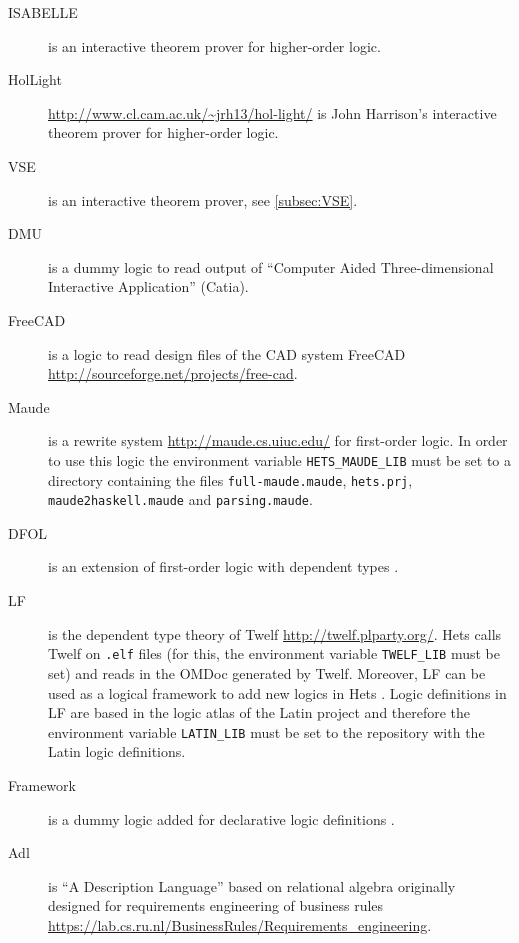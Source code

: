 \documentclass{article}
\newcommand{\normalTEXTSC}[2]{{#1\scriptsize#2}}
\newcommand     {\Isabelle}{\normalTEXTSC{I}{SABELLE}\xspace}
\begin{document}
\begin{description}
\item[\Isabelle] \cite{NipPauWen02} is an interactive theorem prover
  for higher-order logic.

\item[HolLight] \url{http://www.cl.cam.ac.uk/~jrh13/hol-light/}
  is John Harrison's interactive theorem prover
  for higher-order logic.

\item[VSE] is an interactive theorem prover, see \ref{subsec:VSE}.

\item[DMU] is a dummy logic to read output of ``Computer Aided
  Three-dimensional Interactive Application'' (Catia).

\item[FreeCAD] is a logic to read design files of the CAD system
  FreeCAD\\\url{http://sourceforge.net/projects/free-cad}.

\item[Maude] is a rewrite system \url{http://maude.cs.uiuc.edu/} for
  first-order logic. In order to use this logic the environment variable
  \verb+HETS_MAUDE_LIB+ must be set to a directory containing the files
  \verb+full-maude.maude+, \verb+hets.prj+, \verb+maude2haskell.maude+ and
  \verb+parsing.maude+.

\item[DFOL] is an extension of first-order logic with dependent types \cite{rabe:dfol:06}.

\item [LF] is the dependent type theory of Twelf \url{http://twelf.plparty.org/}. Hets
      calls Twelf on \verb+.elf+ files (for this, the environment variable
      \verb+TWELF_LIB+ must be set) and reads in the OMDoc generated by Twelf.
      Moreover, LF can be used as a logical framework to add new logics in Hets \cite{CHK+2011a}.
      Logic definitions in LF are based in the logic atlas of the Latin project \cite{project:latin}
      and therefore the environment variable \verb+LATIN_LIB+ must be set to the
      repository with the Latin logic definitions.

\item[Framework] is a dummy logic added for declarative logic definitions \cite{CHK+2011a}.

\item[Adl] is ``A Description Language'' based on relational algebra originally
  designed for requirements engineering of business rules
  \url{https://lab.cs.ru.nl/BusinessRules/Requirements_engineering}.


\end{description}
\end{document}
